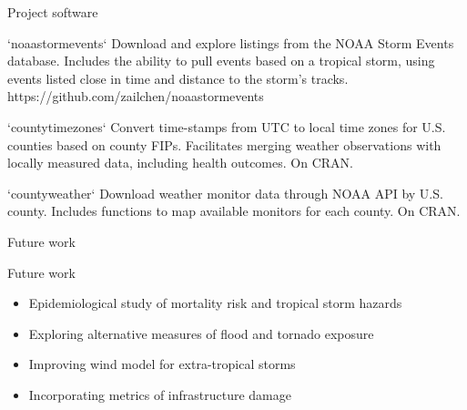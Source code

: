 \documentclass[ignorenonframetext,]{beamer}
\begin{document}
\begin{frame}{Project software}

\footnotesize

\begin{block}{`noaastormevents`}
Download and explore listings from the NOAA Storm Events database. Includes the ability to pull events based on a tropical storm, using events listed close in time and distance to the storm's tracks. 
https://github.com/zailchen/noaastormevents
\end{block}

\footnotesize

\begin{block}{`countytimezones`}
Convert time-stamps from UTC to local time zones for U.S. counties based on county FIPs. Facilitates merging weather observations with locally measured data, including health outcomes. On CRAN.
\end{block}

\footnotesize

\begin{block}{`countyweather`}
Download weather monitor data through NOAA API by U.S. county. Includes functions to map available monitors for each county. On CRAN.
\end{block}

\end{frame}

\begin{frame}{Future work}

\begin{block}{Future work}
\begin{itemize}
\item Epidemiological study of mortality risk and tropical storm hazards
\item Exploring alternative measures of flood and tornado exposure
\item Improving wind model for extra-tropical storms
\item Incorporating metrics of infrastructure damage
\end{itemize}
\end{block}

\end{frame}
\end{document}
